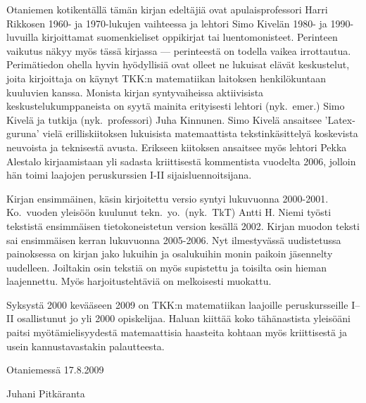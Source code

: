 Otaniemen kotikentällä tämän kirjan edeltäjiä ovat apulaisprofessori Harri Rikkosen
1960- ja 1970-lukujen vaihteessa ja lehtori Simo Kivelän 1980- ja 1990-luvuilla kirjoittamat 
suomenkieliset oppikirjat tai luentomonisteet. Perinteen vaikutus näkyy myös tässä kirjassa
--- perinteestä on todella vaikea irrottautua. Perimätiedon ohella hyvin hyödyllisiä ovat
olleet ne lukuisat elävät keskustelut, joita kirjoittaja on käynyt TKK:n matematiikan
laitoksen henkilökuntaan kuuluvien kanssa. Monista kirjan syntyvaiheissa aktiivisista
keskustelukumppaneista on syytä mainita erityisesti lehtori (nyk.\ emer.) Simo Kivelä ja
tutkija (nyk.\ professori) Juha Kinnunen. Simo Kivelä ansaitsee 'Latex-guruna' vielä
erilliskiitoksen lukuisista matemaattista tekstinkäsittelyä koskevista neuvoista ja
teknisestä avusta. Erikseen kiitoksen ansaitsee myös lehtori Pekka Alestalo kirjaamistaan
yli sadasta kriittisestä kommentista vuodelta 2006, jolloin hän toimi laajojen peruskurssien
I-II sijaisluennoitsijana.

Kirjan ensimmäinen, käsin kirjoitettu versio syntyi lukuvuonna 2000-2001. Ko.\ vuoden
yleisöön kuulunut tekn.\ yo.\ (nyk.\ TkT) Antti H. Niemi työsti tekstistä ensimmäisen
tietokoneistetun version kesällä 2002. Kirjan muodon teksti sai ensimmäisen kerran
lukuvuonna 2005-2006. Nyt ilmestyvässä uudistetussa painoksessa on kirjan jako lukuihin ja
osalukuihin monin paikoin jäsennelty uudelleen. Joiltakin osin tekstiä on myös supistettu ja
toisilta osin hieman laajennettu. Myös harjoitustehtäviä on melkoisesti muokattu.

Syksystä 2000 kevääseen 2009 on TKK:n matematiikan laajoille peruskursseille I--II
osallistunut jo yli 2000 opiskelijaa. Haluan kiittää koko tähänastista yleisöäni paitsi
myötämielisyydestä matemaattisia haasteita kohtaan myös kriittisestä ja usein
kannustavastakin palautteesta.

Otaniemessä 17.8.2009

Juhani Pitkäranta

  
